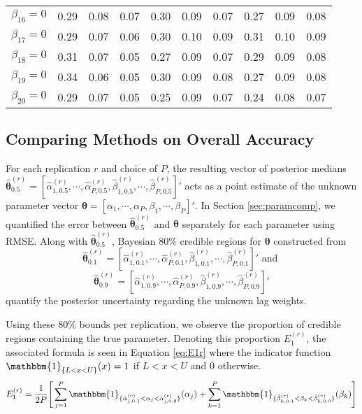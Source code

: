 \begin{table}[htbp]
\begin{tabular}{l|ccc|ccc|ccc}
  $\beta_{16}=0$ & 0.29 & 0.08 & 0.07 & 0.30 & 0.09 & 0.07 & 0.27 & 0.09 & 0.08 \\ 
  $\beta_{17}=0$ & 0.29 & 0.07 & 0.06 & 0.30 & 0.10 & 0.09 & 0.31 & 0.10 & 0.09 \\ 
  $\beta_{18}=0$ & 0.31 & 0.07 & 0.05 & 0.27 & 0.09 & 0.07 & 0.29 & 0.09 & 0.08 \\ 
  $\beta_{19}=0$ & 0.34 & 0.06 & 0.05 & 0.30 & 0.09 & 0.08 & 0.27 & 0.09 & 0.08 \\ 
  $\beta_{20}=0$ & 0.29 & 0.07 & 0.05 & 0.25 & 0.09 & 0.07 & 0.24 & 0.08 & 0.07 \\ 
\hline
\end{tabular}
\label{tab:rmseP20b}
\end{table}


\subsection{Comparing Methods on Overall Accuracy}
For each replication $r$ and choice of $P$, the resulting vector of posterior medians $\hat{\bm{\theta}}^{(r)}_{0.5}=[\hat{\alpha}^{(r)}_{1,0.5},\cdots,\hat{\alpha}^{(r)}_{P,0.5},\hat{\beta}^{(r)}_{1,0.5},\cdots,\hat{\beta}^{(r)}_{P,0.5}]'$ acts as a point estimate of the unknown parameter vector $\bm{\theta}=[\alpha_1,\cdots,\alpha_P,\beta_1,\cdots,\beta_P]'$. In Section \ref{sec:paramcomp}, we quantified the error between $\hat{\bm{\theta}}^{(r)}_{0.5}$ and $\bm{\theta}$ separately for each parameter using RMSE. Along with $\hat{\bm{\theta}}^{(r)}_{0.5}$, Bayesian $80\%$ credible regions for $\bm{\theta}$ constructed from $$\hat{\bm{\theta}}^{(r)}_{0.1}=[\hat{\alpha}^{(r)}_{1,0.1},\cdots,\hat{\alpha}^{(r)}_{P,0.1},\hat{\beta}^{(r)}_{1,0.1},\cdots,\hat{\beta}^{(r)}_{P,0.1}]' \textrm{  and }$$ $$\bm{\hat{\theta}}^{(r)}_{0.9}=[\hat{\alpha}^{(r)}_{1,0.9},\cdots,\hat{\alpha}^{(r)}_{P,0.9},\hat{\beta}^{(r)}_{1,0.9},\cdots,\hat{\beta}^{(r)}_{P,0.9}]'$$ quantify the posterior uncertainty regarding the unknown lag weights. 

Using these $80\%$ bounds per replication, we observe the proportion of credible regions containing the true parameter. Denoting this proportion $E_1^{(r)}$, the associated formula is seen in Equation \ref{eq:E1r} where the indicator function $\mathbbm{1}_{\{L< x <U\}}(x)=1$ if $L<x<U$ and $0$ otherwise.
\begin{equation}
	\label{eq:E1r}
	\begin{split}
	E^{(r)}_1&=\frac{1}{2P}\Bigg[\sum\limits_{j=1}^P \mathbbm{1}_{\{ \hat{\alpha}^{(r)}_{j,0.1}<\alpha_j<\hat{\alpha}^{(r)}_{j,0.9}  \}} (\alpha_j) + \sum\limits_{k=1}^P \mathbbm{1}_{\{ \hat{\beta}^{(r)}_{k,0.1}<\beta_k<\hat{\beta}^{(r)}_{k,0.9}  \}} (\beta_k)\Bigg]\\
	\end{split}
\end{equation}

